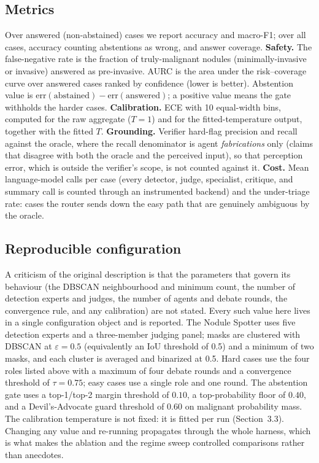 \documentclass[12pt]{article}
\begin{document}
\subsection{Metrics}

Over answered (non-abstained) cases we report accuracy and macro-F1; over all cases, accuracy counting abstentions as wrong, and answer coverage. \textbf{Safety.} The false-negative rate is the fraction of truly-malignant nodules (minimally-invasive or invasive) answered as pre-invasive. AURC is the area under the risk--coverage curve over answered cases ranked by confidence (lower is better). Abstention value is $\mathrm{err}(\text{abstained})-\mathrm{err}(\text{answered})$; a positive value means the gate withholds the harder cases. \textbf{Calibration.} ECE with 10 equal-width bins, computed for the raw aggregate ($T{=}1$) and for the fitted-temperature output, together with the fitted $T$. \textbf{Grounding.} Verifier hard-flag precision and recall against the oracle, where the recall denominator is agent \emph{fabrications} only (claims that disagree with both the oracle and the perceived input), so that perception error, which is outside the verifier's scope, is not counted against it. \textbf{Cost.} Mean language-model calls per case (every detector, judge, specialist, critique, and summary call is counted through an instrumented backend) and the under-triage rate: cases the router sends down the easy path that are genuinely ambiguous by the oracle.

\subsection{Reproducible configuration}\label{sec:config}

A criticism of the original description is that the parameters that govern its behaviour (the DBSCAN neighbourhood and minimum count, the number of detection experts and judges, the number of agents and debate rounds, the convergence rule, and any calibration) are not stated. Every such value here lives in a single configuration object and is reported. The Nodule Spotter uses five detection experts and a three-member judging panel; masks are clustered with DBSCAN at $\varepsilon = 0.5$ (equivalently an IoU threshold of 0.5) and a minimum of two masks, and each cluster is averaged and binarized at 0.5. Hard cases use the four roles listed above with a maximum of four debate rounds and a convergence threshold of $\tau = 0.75$; easy cases use a single role and one round. The abstention gate uses a top-1/top-2 margin threshold of $0.10$, a top-probability floor of $0.40$, and a Devil's-Advocate guard threshold of $0.60$ on malignant probability mass. The calibration temperature is not fixed: it is fitted per run (Section~3.3). Changing any value and re-running propagates through the whole harness, which is what makes the ablation and the regime sweep controlled comparisons rather than anecdotes.
\end{document}

